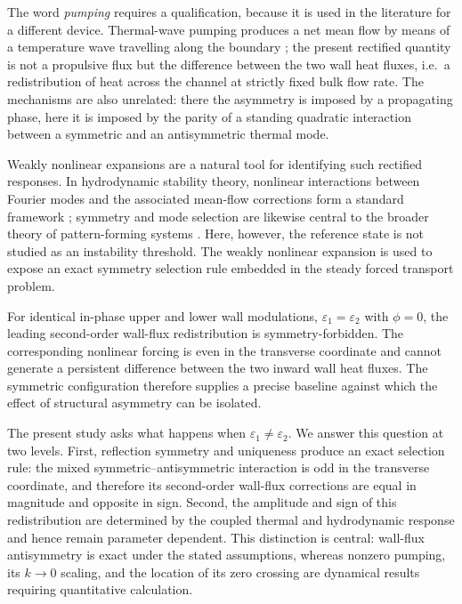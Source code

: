 \documentclass[12pt,a4paper]{article}
\begin{document}
The word \emph{pumping} requires a qualification, because it is used in the literature for a
different device. Thermal-wave pumping produces a net mean flow by means of a temperature wave
travelling along the boundary \cite{HossainFloryan2023}; the present rectified quantity is not a
propulsive flux but the difference between the two wall heat fluxes, i.e.\ a redistribution of heat
across the channel at strictly fixed bulk flow rate. The mechanisms are also unrelated: there the
asymmetry is imposed by a propagating phase, here it is imposed by the parity of a standing
quadratic interaction between a symmetric and an antisymmetric thermal mode.

Weakly nonlinear expansions are a natural tool for identifying such rectified responses. In hydrodynamic
stability theory, nonlinear interactions between Fourier modes and the associated mean-flow corrections
form a standard framework \cite{Stuart1960}; symmetry and mode selection are likewise central to the
broader theory of pattern-forming systems \cite{CrossHohenberg1993}. Here, however, the reference state
is not studied as an instability threshold. The weakly nonlinear expansion is used to expose an exact
symmetry selection rule embedded in the steady forced transport problem.

For identical in-phase upper and lower wall modulations,
$\varepsilon_1=\varepsilon_2$ with $\phi=0$, the leading second-order
wall-flux redistribution is symmetry-forbidden. The corresponding nonlinear forcing is even in the
transverse coordinate and cannot generate a persistent difference between the two inward wall heat
fluxes. The symmetric configuration therefore supplies a precise baseline against which the effect of
structural asymmetry can be isolated.

The present study asks what happens when $\varepsilon_1\neq\varepsilon_2$. We answer this question at
two levels. First, reflection symmetry and uniqueness produce an exact selection rule: the mixed
symmetric--antisymmetric interaction is odd in the transverse coordinate, and therefore its second-order
wall-flux corrections are equal in magnitude and opposite in sign. Second, the amplitude and sign of
this redistribution are determined by the coupled thermal and hydrodynamic response and hence remain
parameter dependent. This distinction is central: wall-flux antisymmetry is exact under the stated
assumptions, whereas nonzero pumping, its $k\to0$ scaling, and the location of its zero crossing are
dynamical results requiring quantitative calculation.
\end{document}
